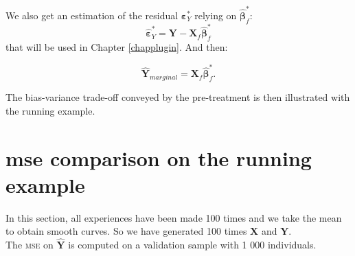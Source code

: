 \documentclass[12pt,a4paper]{report}
\begin{document}
 			We also get an estimation of the residual  $\boldsymbol{\varepsilon}_Y^*$ relying on $\hat{\boldsymbol{\beta}}^*_f$:
	\begin{equation}
		\hat{\boldsymbol{\varepsilon}}_Y^*=\boldsymbol{Y}-\boldsymbol{X}_f\hat{\boldsymbol{\beta}}^*_f \label{estimepsYstar}
	\end{equation}	
	that will be used in Chapter \ref{chapplugin}. And then:
		
	\begin{equation}
	\hat{\boldsymbol{Y}}_{marginal}=\boldsymbol{X}_f\hat{\boldsymbol{\beta}}_f^*. \nonumber %
	\end{equation}
	  
	The bias-variance trade-off conveyed by the pre-treatment is then illustrated with the running example.
	\section{{\sc mse} comparison on the running example}\label{MSEvraiS}
In this section, all experiences have been made 100 times and we take the mean to obtain smooth curves. So we have generated 100 times $\boldsymbol{X}$ and $\boldsymbol{Y}$.\\	
	The \textsc{mse} on $\hat{\boldsymbol{Y}}$ is computed on a validation sample with 1 000 individuals.\\
%
\end{document}

